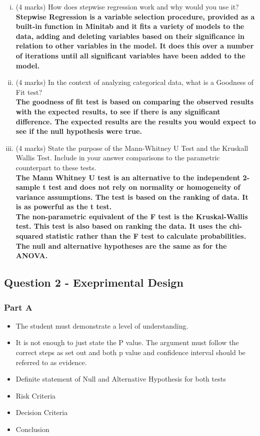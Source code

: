\documentclass[a4paper,12pt]{article}
\begin{document}
\begin{enumerate}[(i)]
	
	\item (4 marks) How does stepwise regression work and why would you use it?\\
	\textbf{Stepwise Regression is a variable selection procedure, provided as a built-in function in Minitab and it fits a variety of models
		to the data, adding and deleting variables based on their significance in relation to
		other variables in the model. It does this over a number of iterations until all significant
		variables have been added to the model. }
	\item (4 marks) In the context of analyzing categorical data, what is a Goodness of Fit test?\\ 
	\textbf{The goodness of fit test is based
		on comparing the observed results with the expected results, to see if there is any significant difference.
		The expected results are the results you would expect to see if the null
		hypothesis were true.}
	\item (4 marks) State the purpose of the Mann-Whitney U Test and the Kruskall Wallis Test. Include in your answer comparisons to the parametric counterpart to these tests.\\
	\textbf{The Mann Whitney U test is an alternative to the independent 2-sample t test and does
	not rely on normality or homogeneity of variance assumptions. The test is based on the
	ranking of data. It is as powerful as the t test.}\\
	\textbf{The non-parametric equivalent of the F test is the Kruskal-Wallis test.
	This test is also based on ranking the data. It uses the chi-squared
	statistic rather than the F test to calculate probabilities. The null and
	alternative hypotheses are the same as for the ANOVA.}
	
\end{enumerate}

\subsection*{Question 2 - Exeprimental Design}


\subsubsection*{Part A}
\begin{itemize}
	\item The student must demonstrate a level of understanding.
	\item  It is not enough to just state
	the P value. The argument must follow the correct steps as set out and both p value
	and confidence interval should be referred to as evidence.
	\item Definite statement of Null and Alternative Hypothesis for both tests
	\item Risk Criteria
	\item Decision Criteria
	\item Conclusion
\end{itemize}
\end{document}

